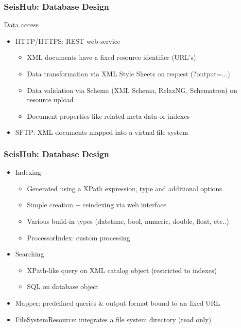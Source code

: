 \documentclass[t,10pt,compress=false,usepdftitle=false]{beamer}
\begin{document}
\begin{frame}[fragile]
    \frametitle{SeisHub: Database Design}
    Data access
    \begin{itemize}
        \item HTTP/HTTPS: REST web service
        \begin{itemize}
            \item XML documents have a fixed resource identifier (URL's)
            \item Data transformation via XML Style Sheets on request (?output=...)
            \item Data validation via Schema (XML Schema, RelaxNG, Schematron) on resource upload
            \item Document properties like related meta data or indexes
        \end{itemize}
        \item SFTP: XML documents mapped into a virtual file system
    \end{itemize}
\end{frame}

\begin{frame}[fragile]
    \frametitle{SeisHub: Database Design}
    \begin{itemize}
        \item Indexing
        \begin{itemize}
            \item Generated using a XPath expression, type and additional options
            \item Simple creation + reindexing via web interface
            \item Various build-in types (datetime, bool, numeric, double, float, etc..)
            \item ProcessorIndex: custom processing
        \end{itemize}
        \item Searching
        \begin{itemize}
            \item XPath-like query on XML catalog object (restricted to indexes)
            \item SQL on database object
        \end{itemize}
        \item Mapper: predefined queries \& output format bound to an fixed URL
        \item FileSystemResource: integrates a file system directory (read only)
    \end{itemize}
\end{frame}
\end{document}
